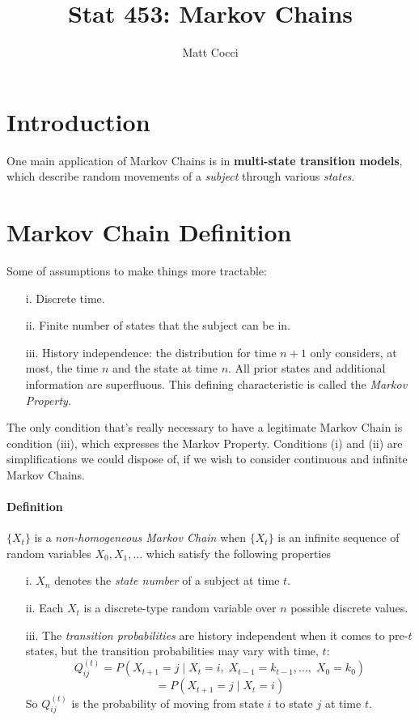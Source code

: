 \documentclass[a4paper,12pt]{scrartcl}
\author{Matt Cocci}
\title{Stat 453: Markov Chains}
\begin{document}
\maketitle

\section{Introduction}

One main application of Markov Chains is in \textbf{multi-state 
transition models}, which describe random movements of a \emph{subject}
through various \emph{states}.  

\section{Markov Chain Definition}

Some of assumptions to make things more tractable:
\begin{enumerate}
   \item[i.]{Discrete time.}
   \item[ii.]{Finite number of states that the subject can be in.}
   \item[iii.]{History independence: the distribution for time $n+1$
      only considers, at most, the time $n$ and the state at time $n$.
      All prior states and additional information are superfluous. 
      This defining characteristic is called the {\sl Markov
      Property}.}
\end{enumerate}
The only condition that's really necessary to have a legitimate 
Markov Chain is condition (iii), which expresses the Markov Property.
Conditions (i) and (ii) are simplifications we could dispose of, if
we wish to consider continuous and infinite Markov Chains.

\paragraph{Definition} $\{X_t\}$ is a {\sl non-homogeneous Markov Chain}
when $\{X_t\}$ is an infinite sequence of random variables $X_0, X_1,\ldots$
which satisfy the following properties
\begin{enumerate}
   \item[i.]{$X_n$ denotes the \emph{state number} of a subject at time
      $t$.}
   \item[ii.]{Each $X_t$ is a discrete-type random variable over $n$
      possible discrete values.}
   \item[iii.]{The {\sl transition probabilities} are history
      independent when it comes to pre-$t$ states, 
      but the transition probabilities may vary with time, $t$:
      \[ Q_{ij}^{(t)} = P( X_{t+1}=j \; | \; X_t = i, \; X_{t-1}=k_{t-1},
	 \ldots,\; X_0 = k_0 ) \]
      \[ =P(X_{t+1} = j \; | \; X_t = i ) \]
      So $Q_{ij}^{(t)}$ is the probability of moving from
      state $i$ to state $j$ at time $t$.
      }
\end{enumerate}
\end{document}
